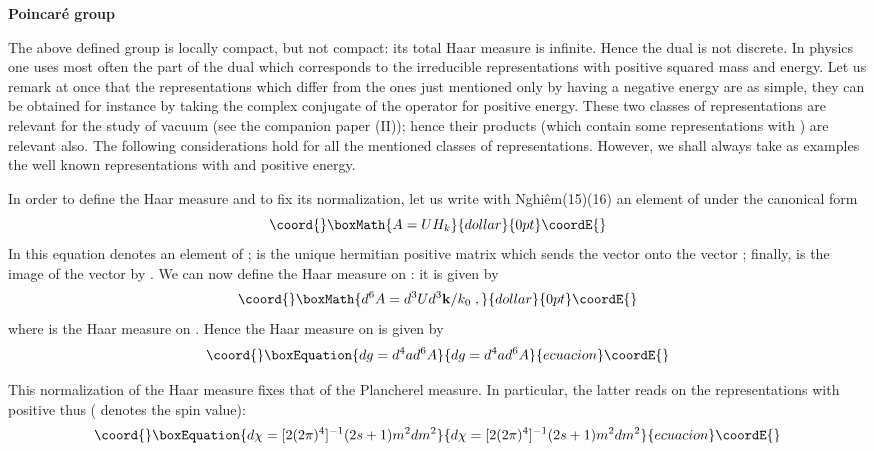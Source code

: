 \documentclass[a4paper,11pt]{article}
\begin{document}
{\bf Poincar\'e group \coordHE{}}

The above defined group \coordHE{} is locally compact, but not compact: its total Haar measure is 
infinite. Hence the dual is not discrete. In physics one uses most often the part of the dual 
which corresponds to the irreducible representations with positive squared mass and energy. Let 
us remark at once that the representations which differ from the ones just mentioned only by 
having a negative energy are as simple, they can be obtained for instance by taking the complex 
conjugate of the operator for positive energy. These two classes of representations are 
relevant for the study of vacuum (see the companion paper (II)); hence their products (which 
contain some representations with \coordHE{}) are relevant also. The following considerations hold 
for all the mentioned classes of representations. However, we shall always take as examples the 
well known representations with \coordHE{} and positive energy. 

In order to define the Haar measure and to fix its normalization, let us write with Nghi\^em(15)(16)
an element of \coordHE{} under the canonical form
$$\coord{}\boxMath{
 A = U H_k
}{dollar}{0pt}\coordE{}$$
 In this equation \coordHE{} denotes an 
element of \coordHE{}; \coordHE{} is the unique hermitian positive matrix which sends the vector \coordHE{} 
onto the 
vector \coordHE{}; finally, \coordHE{} is the image of the vector \coordHE{} by \coordHE{}. We can now 
define the Haar measure on \coordHE{}: it is given by
$$\coord{}\boxMath{
  d^6 A = d^3 U d^3 \mathbf{k} / k_0  \;,
}{dollar}{0pt}\coordE{}$$
where \coordHE{} is the Haar measure on \coordHE{}. Hence the Haar measure on \coordHE{} is given by
\begin{equation}\coord{}\boxEquation{
 \label{eq.3.10}
  dg = d^4 a d^6 A
}{
 dg = d^4 a d^6 A
}{ecuacion}\coordE{}\end{equation}

This normalization of the Haar measure fixes that of the Plancherel measure. In particular, 
the latter reads on the representations with positive \coordHE{} thus (\coordHE{} denotes the spin value):
\begin{equation}\coord{}\boxEquation{
 \label{eq.3.11}
  d\chi = [2(2\pi)^4]^{-1} (2s+1) m^2 dm^2
}{
 d\chi = [2(2\pi)^4]^{-1} (2s+1) m^2 dm^2
}{ecuacion}\coordE{}\end{equation}
\end{document}
